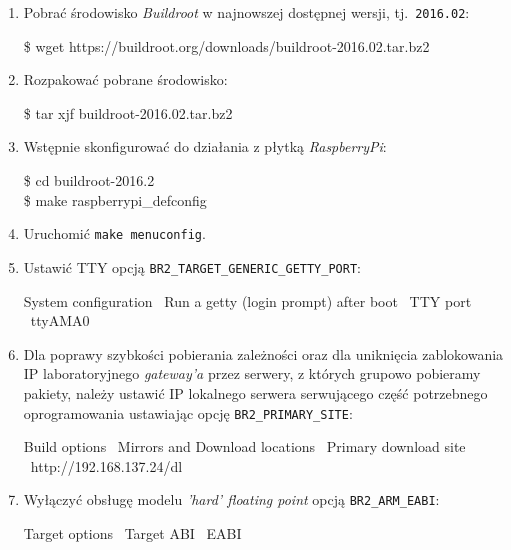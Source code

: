 \documentclass{article}
\newenvironment{ttblock}{\ttfamily}{\par}
\begin{document}
\begin{enumerate}
\item Pobrać środowisko \emph{Buildroot} w najnowszej dostępnej wersji, tj.~\texttt{2016.02}:

\begin{ttblock}
\$ wget https://buildroot.org/downloads/buildroot-2016.02.tar.bz2
\end{ttblock}

\item Rozpakować pobrane środowisko:

\begin{ttblock}
\$ tar xjf buildroot-2016.02.tar.bz2
\end{ttblock}

\item Wstępnie skonfigurować do działania z płytką \emph{RaspberryPi}:

\begin{ttblock}
\$ cd buildroot-2016.2\\
\$ make raspberrypi\_defconfig
\end{ttblock}

\item Uruchomić \texttt{make menuconfig}.

\item Ustawić TTY opcją \texttt{BR2\_TARGET\_GENERIC\_GETTY\_PORT}:

\begin{ttblock}
System configuration \textrightarrow\ Run a getty (login prompt) after boot \textrightarrow\ TTY port \textrightarrow\ ttyAMA0
\end{ttblock}

\item Dla poprawy szybkości pobierania zależności oraz dla uniknięcia zablokowania IP laboratoryjnego \emph{gateway'a} przez serwery, z których grupowo pobieramy pakiety, należy ustawić IP lokalnego serwera serwującego część potrzebnego oprogramowania ustawiając opcję \texttt{BR2\_PRIMARY\_SITE}:

\begin{ttblock}
Build options \textrightarrow\ Mirrors and Download locations \textrightarrow\ Primary download site \textrightarrow\ http://192.168.137.24/dl
\end{ttblock}

\item Wyłączyć obsługę modelu \emph{'hard' floating point} opcją \texttt{BR2\_ARM\_EABI}:

\begin{ttblock}
Target options \textrightarrow\ Target ABI \textrightarrow\ EABI
\end{ttblock}


\end{enumerate}
\end{document}
